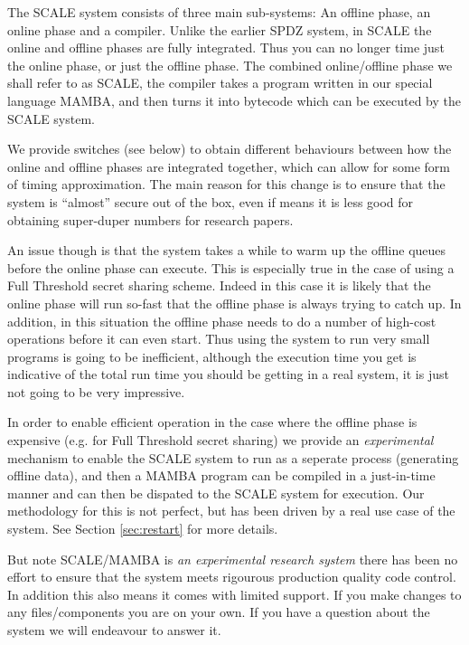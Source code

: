 

\label{sec:introduction}
The SCALE system consists of three main sub-systems:
An offline phase, an online phase and a compiler. 
Unlike the earlier SPDZ system, in SCALE the online
and offline phases are fully integrated. Thus you
can no longer time just the online phase, or just
the offline phase.
The combined online/offline phase we shall refer
to as SCALE, the compiler takes a program written
in our special language MAMBA, and then turns it
into bytecode which can be executed by the SCALE
system.

We provide switches (see below) to obtain 
different behaviours between how the online and offline
phases are integrated together, which can allow for
some form of timing approximation.
The main reason for this change is to ensure that the
system is ``almost'' secure out of the box, even if
means it is less good for obtaining super-duper numbers
for research papers.

An issue though is that the system takes a while to warm
up the offline queues before the online phase can execute.
This is especially true in the case of using a Full Threshold
secret sharing scheme. Indeed in this case it is likely
that the online phase will run so-fast that the offline
phase is always trying to catch up. In addition, in this
situation the offline phase needs to do a number of
high-cost operations before it can even start. Thus
using the system to run very small programs is going to
be inefficient, although the execution time you get
is indicative of the total run time you should be getting
in a real system, it is just not going to be very
impressive.

In order to enable efficient operation in the case where the
offline phase is expensive (e.g. for Full Threshold secret sharing)
we provide an {\em experimental} mechanism to enable the SCALE system to run
as a seperate process (generating offline data), and then
a MAMBA program can be compiled in a just-in-time manner
and can then be dispated to the SCALE system for
execution. Our methodology for this is not perfect, but has
been driven by a real use case of the system.
See Section \ref{sec:restart} for more details.

But note SCALE/MAMBA is {\em an experimental research system} 
there has been no effort to ensure that the system meets rigourous production
quality code control. 
In addition this also means it comes with limited support.
If you make changes to any files/components you are on your
own.
If you have a question about the system we will endeavour to
answer it.

